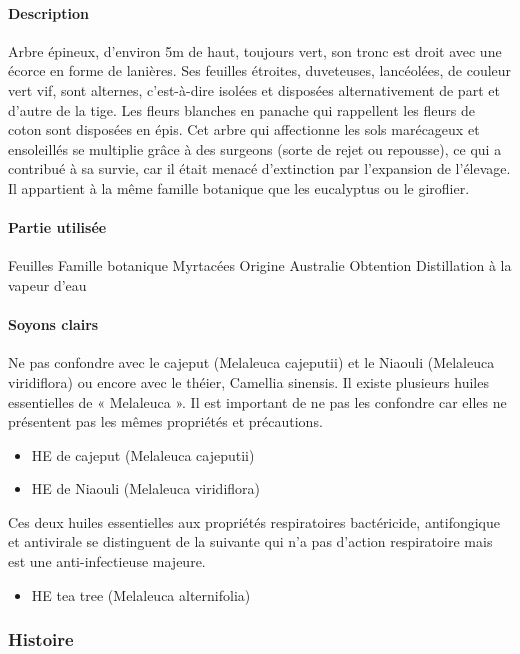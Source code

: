 \documentclass[12pt,a4wide]{article}
\begin{document}
\paragraph{Description}
\label{sec-4-8-2-1}
Arbre épineux, d'environ 5m de haut, toujours vert, son tronc est droit avec une écorce en forme de lanières. Ses feuilles étroites, duveteuses, lancéolées, de couleur vert vif, sont alternes, c'est-à-dire isolées et disposées alternativement de part et d'autre de la tige. Les fleurs blanches en panache qui rappellent les fleurs de coton sont disposées en épis. Cet arbre qui affectionne les sols marécageux et ensoleillés se multiplie grâce à des surgeons (sorte de rejet ou repousse), ce qui a contribué à sa survie, car il était menacé d'extinction par l'expansion de l'élevage. Il appartient à la même famille botanique que les eucalyptus ou le giroflier.

\paragraph{Partie utilisée}
\label{sec-4-8-2-2}
Feuilles
Famille botanique
Myrtacées
Origine
Australie
Obtention
Distillation à la vapeur d'eau


\paragraph{Soyons clairs}
\label{sec-4-8-2-3}

Ne pas confondre avec le cajeput (Melaleuca cajeputii) et le Niaouli (Melaleuca viridiflora) ou encore avec le théier, Camellia sinensis.
Il existe plusieurs huiles essentielles de « Melaleuca ». Il est important de ne pas les confondre car elles ne présentent pas les mêmes propriétés et précautions.
\begin{itemize}
\item HE de cajeput (Melaleuca cajeputii)
\item HE de Niaouli (Melaleuca viridiflora)
\end{itemize}
Ces deux huiles essentielles aux propriétés respiratoires bactéricide, antifongique et antivirale se distinguent de la suivante qui n'a pas d'action respiratoire mais est une anti-infectieuse majeure.
\begin{itemize}
\item HE tea tree (Melaleuca alternifolia)
\end{itemize}

\subsubsection{Histoire}
\label{sec-4-8-3}
\end{document}
